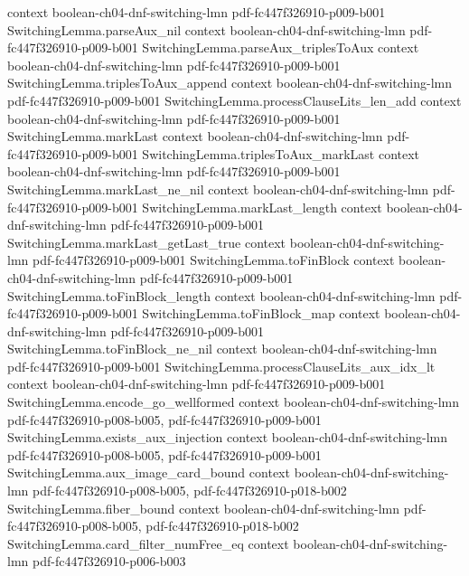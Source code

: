 \begin{theorem}
  {context}
  {boolean-ch04-dnf-switching-lmn}
  {pdf-fc447f326910-p009-b001}
\proofstep
  {SwitchingLemma.parseAux_nil}
  {context}
  {boolean-ch04-dnf-switching-lmn}
  {pdf-fc447f326910-p009-b001}
\proofstep
  {SwitchingLemma.parseAux_triplesToAux}
  {context}
  {boolean-ch04-dnf-switching-lmn}
  {pdf-fc447f326910-p009-b001}
\proofstep
  {SwitchingLemma.triplesToAux_append}
  {context}
  {boolean-ch04-dnf-switching-lmn}
  {pdf-fc447f326910-p009-b001}
\proofstep
  {SwitchingLemma.processClauseLits_len_add}
  {context}
  {boolean-ch04-dnf-switching-lmn}
  {pdf-fc447f326910-p009-b001}
\proofstep
  {SwitchingLemma.markLast}
  {context}
  {boolean-ch04-dnf-switching-lmn}
  {pdf-fc447f326910-p009-b001}
\proofstep
  {SwitchingLemma.triplesToAux_markLast}
  {context}
  {boolean-ch04-dnf-switching-lmn}
  {pdf-fc447f326910-p009-b001}
\proofstep
  {SwitchingLemma.markLast_ne_nil}
  {context}
  {boolean-ch04-dnf-switching-lmn}
  {pdf-fc447f326910-p009-b001}
\proofstep
  {SwitchingLemma.markLast_length}
  {context}
  {boolean-ch04-dnf-switching-lmn}
  {pdf-fc447f326910-p009-b001}
\proofstep
  {SwitchingLemma.markLast_getLast_true}
  {context}
  {boolean-ch04-dnf-switching-lmn}
  {pdf-fc447f326910-p009-b001}
\proofstep
  {SwitchingLemma.toFinBlock}
  {context}
  {boolean-ch04-dnf-switching-lmn}
  {pdf-fc447f326910-p009-b001}
\proofstep
  {SwitchingLemma.toFinBlock_length}
  {context}
  {boolean-ch04-dnf-switching-lmn}
  {pdf-fc447f326910-p009-b001}
\proofstep
  {SwitchingLemma.toFinBlock_map}
  {context}
  {boolean-ch04-dnf-switching-lmn}
  {pdf-fc447f326910-p009-b001}
\proofstep
  {SwitchingLemma.toFinBlock_ne_nil}
  {context}
  {boolean-ch04-dnf-switching-lmn}
  {pdf-fc447f326910-p009-b001}
\proofstep
  {SwitchingLemma.processClauseLits_aux_idx_lt}
  {context}
  {boolean-ch04-dnf-switching-lmn}
  {pdf-fc447f326910-p009-b001}
\proofstep
  {SwitchingLemma.encode_go_wellformed}
  {context}
  {boolean-ch04-dnf-switching-lmn}
  {pdf-fc447f326910-p008-b005,
    pdf-fc447f326910-p009-b001}
\proofstep
  {SwitchingLemma.exists_aux_injection}
  {context}
  {boolean-ch04-dnf-switching-lmn}
  {pdf-fc447f326910-p008-b005,
    pdf-fc447f326910-p009-b001}
\proofstep
  {SwitchingLemma.aux_image_card_bound}
  {context}
  {boolean-ch04-dnf-switching-lmn}
  {pdf-fc447f326910-p008-b005,
    pdf-fc447f326910-p018-b002}
\proofstep
  {SwitchingLemma.fiber_bound}
  {context}
  {boolean-ch04-dnf-switching-lmn}
  {pdf-fc447f326910-p008-b005,
    pdf-fc447f326910-p018-b002}
\proofstep
  {SwitchingLemma.card_filter_numFree_eq}
  {context}
  {boolean-ch04-dnf-switching-lmn}
  {pdf-fc447f326910-p006-b003}

\end{theorem}
